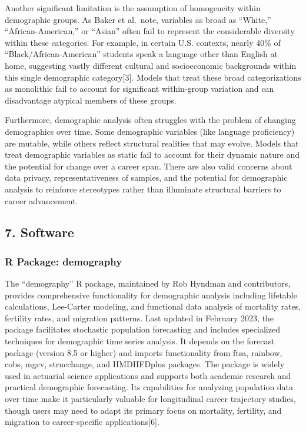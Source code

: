\documentclass[
  letterpaper,
  DIV=11,
  numbers=noendperiod]{scrartcl}
\begin{document}
Another significant limitation is the assumption of homogeneity within
demographic groups. As Baker et al.~note, variables as broad as
``White,'' ``African-American,'' or ``Asian'' often fail to represent
the considerable diversity within these categories. For example, in
certain U.S. contexts, nearly 40\% of ``Black/African-American''
students speak a language other than English at home, suggesting vastly
different cultural and socioeconomic backgrounds within this single
demographic category{[}3{]}. Models that treat these broad
categorizations as monolithic fail to account for significant
within-group variation and can disadvantage atypical members of these
groups.

Furthermore, demographic analysis often struggles with the problem of
changing demographics over time. Some demographic variables (like
language proficiency) are mutable, while others reflect structural
realities that may evolve. Models that treat demographic variables as
static fail to account for their dynamic nature and the potential for
change over a career span. There are also valid concerns about data
privacy, representativeness of samples, and the potential for
demographic analysis to reinforce stereotypes rather than illuminate
structural barriers to career advancement.

\subsection{7. Software}\label{software}

\subsubsection{R Package: demography}\label{r-package-demography}

The ``demography'' R package, maintained by Rob Hyndman and
contributors, provides comprehensive functionality for demographic
analysis including lifetable calculations, Lee-Carter modeling, and
functional data analysis of mortality rates, fertility rates, and
migration patterns. Last updated in February 2023, the package
facilitates stochastic population forecasting and includes specialized
techniques for demographic time series analysis. It depends on the
forecast package (version 8.5 or higher) and imports functionality from
ftsa, rainbow, cobs, mgcv, strucchange, and HMDHFDplus packages. The
package is widely used in actuarial science applications and supports
both academic research and practical demographic forecasting. Its
capabilities for analyzing population data over time make it
particularly valuable for longitudinal career trajectory studies, though
users may need to adapt its primary focus on mortality, fertility, and
migration to career-specific applications{[}6{]}.
\end{document}
